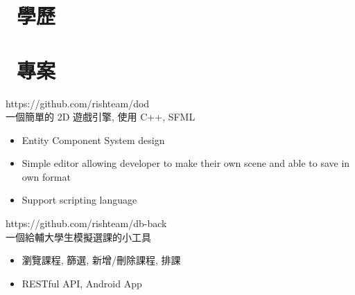 \documentclass{resume}
\begin{document}



\section{\faGraduationCap\ 學歷}




\section{\faTasks\ 專案}

{\small https://github.com/rishteam/dod} \\
一個簡單的 2D 遊戲引擎, 使用 C++, SFML
\begin{itemize}
  \item Entity Component System design
  \item Simple editor allowing developer to make their own scene and able to save in own format
  \item Support scripting language
\end{itemize}

{\small https://github.com/rishteam/db-back} \\
一個給輔大學生模擬選課的小工具
\begin{itemize}
  \item 瀏覽課程, 篩選, 新增/刪除課程, 排課
  \item RESTful API, Android App
\end{itemize}
\end{document}
